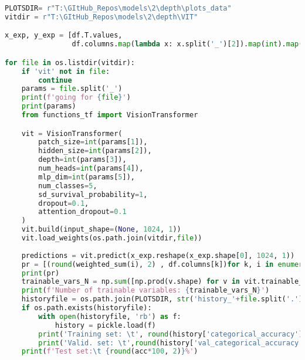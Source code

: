 \begin{lstlisting}[language=Python]
PLOTSDIR= r"T:\GItHub_Repos\models\2\depth\plots_data"
vitdir = r"T:\GItHub_Repos\models\2\depth\VIT"

x_exp, y_exp = [df.T.values,
                df.columns.map(lambda x: x.split('_')[2]).map(int).map(angstrom_to_label)]

for file in os.listdir(vitdir):
    if 'vit' not in file:
        continue
    params = file.split('_')
    print(f'going for {file}')
    print(params)
    from functions_tf import VisionTransformer

    vit = VisionTransformer(
        patch_size=int(params[1]),
        hidden_size=int(params[2]),
        depth=int(params[3]),
        num_heads=int(params[4]),
        mlp_dim=int(params[5]),
        num_classes=5,
        sd_survival_probability=1,
        dropout=0.1,
        attention_dropout=0.1
    )
    vit.build(input_shape=(None, 1024, 1))
    vit.load_weights(os.path.join(vitdir,file))
    
    predictions = vit.predict(x_exp.reshape(x_exp.shape[0], 1024, 1))
    pr = [(round(weighted_sum(i), 2) , df.columns[k])for k, i in enumerate(predictions)]
    print(pr)
    trainable_vars_N = np.sum([np.prod(v.shape) for v in vit.trainable_variables])
    print(f'Number of trainable variables: {trainable_vars_N}')
    historyfile = os.path.join(PLOTSDIR, str('history_'+file.split('.')[0][:-8]+'.pkl'))
    if os.path.exists(historyfile):
        with open(historyfile, 'rb') as f:
            history = pickle.load(f)
        print('Training set: \t', round(history['categorical_accuracy'][-1]*100, 2), '%')
        print('Valid. set: \t',round(history['val_categorical_accuracy'][-1]*100, 2), '%')
    print(f'Test set:\t {round(acc*100, 2)}%')
\end{lstlisting}
